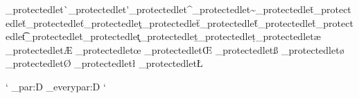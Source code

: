 

\let\brl@orig@set@color\set@color
\let\brl@orig@fbox\fbox

\brl@def_protectedlet\brl@orig@csgrave\`
\brl@def_protectedlet\brl@orig@csacute\'
\brl@def_protectedlet\brl@orig@cscircumflex\^
\brl@def_protectedlet\brl@orig@cstilde\~
\brl@def_protectedlet\brl@orig@csmacron\=
\brl@def_protectedlet\brl@orig@csbreve\u
\brl@def_protectedlet\brl@orig@cscaron\v
\brl@def_protectedlet\brl@orig@cscedilla\c
\brl@def_protectedlet\brl@orig@csumlaut\"
\brl@def_protectedlet\brl@orig@cshumlaut\H
\brl@def_protectedlet\brl@orig@csring\r
\brl@def_protectedlet\brl@orig@cstie\t
\brl@def_protectedlet\brl@orig@csdotover\.
\brl@def_protectedlet\brl@orig@csogonek\k
\brl@def_protectedlet\brl@orig@csbarunder\b
\brl@def_protectedlet\brl@orig@csdotunder\d

\brl@def_protectedlet\brl@orig@ae\ae
\brl@def_protectedlet\brl@orig@AE\AE
\brl@def_protectedlet\brl@orig@oe\oe
\brl@def_protectedlet\brl@orig@OE\OE
\brl@def_protectedlet\brl@orig@ss\ss
\brl@def_protectedlet\brl@orig@o\o
\brl@def_protectedlet\brl@orig@O\O
\brl@def_protectedlet\brl@orig@l\l
\brl@def_protectedlet\brl@orig@L\L


\ifdefined\RawParEnd%
  \catcode`\relax
  \let\brl@orig@par\tex_par:D%
  \let\brl@orig@everypar\tex_everypar:D%
  \catcode`\relax
\else%
  \let\brl@orig@par\par
  \let\brl@orig@everypar\everypar
\fi%


\endinput


